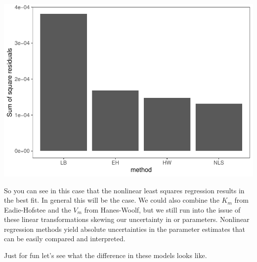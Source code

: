 \documentclass[
]{article}
\begin{document}
\includegraphics{Bioprocess_Engineering_files/figure-latex/unnamed-chunk-39-1.pdf}

So you can see in this case that the nonlinear least squares regression results in the best fit. In general this will be the case. We could also combine the \(K_m\) from Eadie-Hofstee and the \(V_m\) from Hanes-Woolf, but we still run into the issue of these linear transformations skewing our uncertainty in or parameters. Nonlinear regression methods yield absolute uncertainties in the parameter estimates that can be easily compared and interpreted.

Just for fun let's see what the difference in these models looks like.
\end{document}
